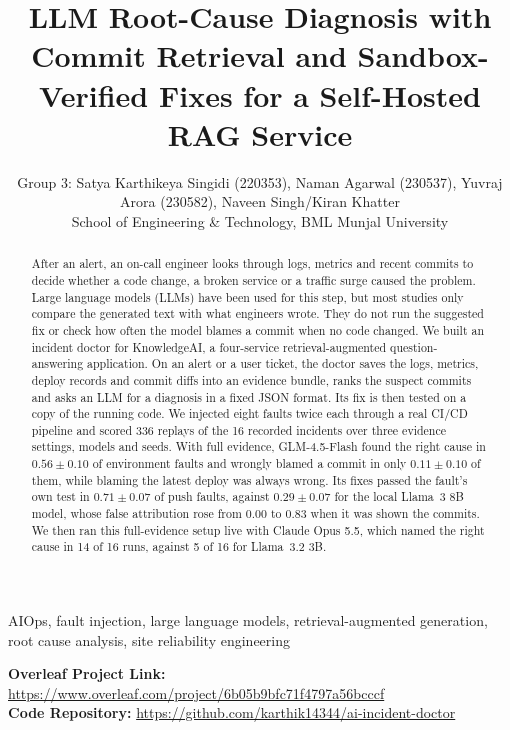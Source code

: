 \documentclass[12pt,onecolumn,draftclsnofoot]{IEEEtran}
\begin{document}
\title{LLM Root-Cause Diagnosis with Commit Retrieval and Sandbox-Verified Fixes for a Self-Hosted RAG Service}

\author{Group 3: Satya Karthikeya Singidi (220353), Naman Agarwal (230537), Yuvraj Arora (230582), Naveen Singh/Kiran Khatter\\
School of Engineering \& Technology, BML Munjal University}

\maketitle

\begin{abstract}
After an alert, an on-call engineer looks through logs, metrics and recent commits to decide whether a code change, a broken service or a traffic surge caused the problem. Large language models (LLMs) have been used for this step, but most studies only compare the generated text with what engineers wrote. They do not run the suggested fix or check how often the model blames a commit when no code changed. We built an incident doctor for KnowledgeAI, a four-service retrieval-augmented question-answering application. On an alert or a user ticket, the doctor saves the logs, metrics, deploy records and commit diffs into an evidence bundle, ranks the suspect commits and asks an LLM for a diagnosis in a fixed JSON format. Its fix is then tested on a copy of the running code. We injected eight faults twice each through a real CI/CD pipeline and scored 336 replays of the 16 recorded incidents over three evidence settings, models and seeds. With full evidence, GLM-4.5-Flash found the right cause in $0.56\pm0.10$ of environment faults and wrongly blamed a commit in only $0.11\pm0.10$ of them, while blaming the latest deploy was always wrong. Its fixes passed the fault's own test in $0.71\pm0.07$ of push faults, against $0.29\pm0.07$ for the local Llama~3 8B model, whose false attribution rose from $0.00$ to $0.83$ when it was shown the commits. We then ran this full-evidence setup live with Claude Opus 5.5, which named the right cause in 14 of 16 runs, against 5 of 16 for Llama~3.2 3B.
\end{abstract}

\begin{IEEEkeywords}
AIOps, fault injection, large language models, retrieval-augmented generation, root cause analysis, site reliability engineering
\end{IEEEkeywords}

\noindent\textbf{Overleaf Project Link:} \url{https://www.overleaf.com/project/6b05b9bfc71f4797a56bcccf}\\
\noindent\textbf{Code Repository:} \url{https://github.com/karthik14344/ai-incident-doctor}
\end{document}
